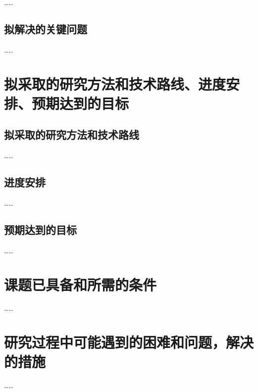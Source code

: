 ……

\subsection{拟解决的关键问题}

……

\section{拟采取的研究方法和技术路线、进度安排、预期达到的目标}

\subsection{拟采取的研究方法和技术路线}

……

\subsection{进度安排}

……

\subsection{预期达到的目标}

……

\section{课题已具备和所需的条件}

……

\section{研究过程中可能遇到的困难和问题，解决的措施}

……

